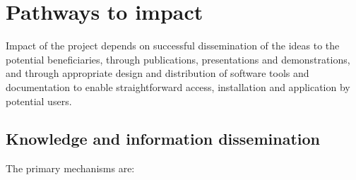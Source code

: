 \documentclass[a4paper,11pt]{article}
\begin{document}
\clearpage
\setcounter{page}{1}

\section*{Pathways to impact}

Impact of the project depends on successful dissemination of the ideas
to the potential beneficiaries, through publications, presentations
and demonstrations, and through appropriate design and distribution of
software tools and documentation to enable straightforward access,
installation and application by potential users.

\subsection*{Knowledge and information dissemination}

The primary mechanisms are:
\end{document}
